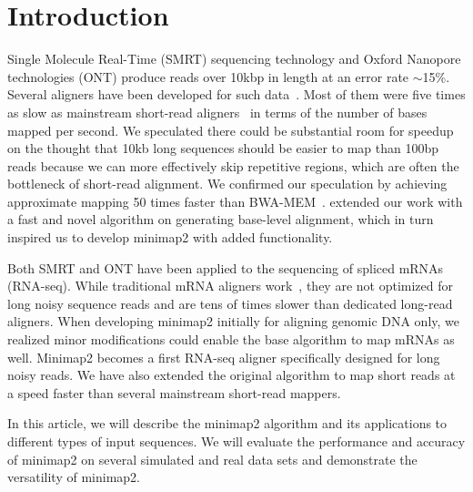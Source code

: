 \documentclass{bioinfo}
\begin{document}
\section{Introduction}

Single Molecule Real-Time (SMRT) sequencing technology and Oxford Nanopore
technologies (ONT) produce reads over 10kbp in length at an error rate
$\sim$15\%. Several aligners have been developed for such
data~\citep{Chaisson:2012aa,Li:2013aa,Liu:2016ab,Sovic:2016aa,Liu:2017aa,Lin:2017aa,Sedlazeck169557}.
Most of them were five times as slow as mainstream short-read
aligners~\citep{Langmead:2012fk,Li:2013aa} in terms of the number of bases
mapped per second. We speculated there could be substantial room for speedup on
the thought that 10kb long sequences should be easier to map than 100bp reads
because we can more effectively skip repetitive regions, which are often the
bottleneck of short-read alignment. We confirmed our speculation by achieving
approximate mapping 50 times faster than BWA-MEM~\citep{Li:2016aa}.
\citet{Suzuki130633} extended our work with a fast and novel algorithm on
generating base-level alignment, which in turn inspired us to develop minimap2
with added functionality.

Both SMRT and ONT have been applied to the sequencing of spliced mRNAs (RNA-seq). While
traditional mRNA aligners work~\citep{Wu:2005vn,Iwata:2012aa}, they are not
optimized for long noisy sequence reads and are tens of times slower than
dedicated long-read aligners. When developing minimap2 initially for aligning
genomic DNA only, we realized minor modifications could enable the base
algorithm to map mRNAs as well. Minimap2 becomes a first RNA-seq aligner
specifically designed for long noisy reads. We have also extended the original
algorithm to map short reads at a speed faster than several mainstream
short-read mappers.

In this article, we will describe the minimap2 algorithm and its applications
to different types of input sequences. We will evaluate the performance and
accuracy of minimap2 on several simulated and real data sets and demonstrate
the versatility of minimap2.
\end{document}
